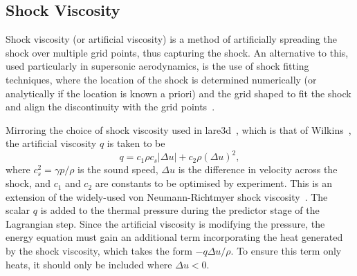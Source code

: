 \subsection{Shock Viscosity}

Shock viscosity (or artificial viscosity) is a method of artificially spreading the shock over multiple grid points, thus capturing the shock. An alternative to this, used particularly in supersonic aerodynamics, is the use of shock fitting techniques, where the location of the shock is determined numerically (or analytically if the location is known a priori) and the grid shaped to fit the shock and align the discontinuity with the grid points~\cite{paciorriShockfittingTechnique2D2009}.

Mirroring the choice of shock viscosity used in lare3d~\cite{arberStaggeredGridLagrangian2001}, which is that of Wilkins~\cite{wilkinsUseArtificialViscosity1980a}, the artificial viscosity $q$ is taken to be
\begin{equation}
  \label{eq:artificial_viscosity}
q = c_1 \rho c_s | \Delta u | + c_2 \rho (\Delta u)^2,
\end{equation}
where $c_s^2 = \gamma p / \rho$ is the sound speed, $\Delta u$ is the difference in velocity across the shock, and $c_1$ and $c_2$ are constants to be optimised by experiment. This is an extension of the widely-used von Neumann-Richtmyer shock viscosity~\cite{vonneumannMethodNumericalCalculation1950}. The scalar $q$ is added to the thermal pressure during the predictor stage of the Lagrangian step. Since the artificial viscosity is modifying the pressure, the energy equation must gain an additional term incorporating the heat generated by the shock viscosity, which takes the form $-q\Delta u/\rho$. To ensure this term only heats, it should only be included where $\Delta u < 0$. 

